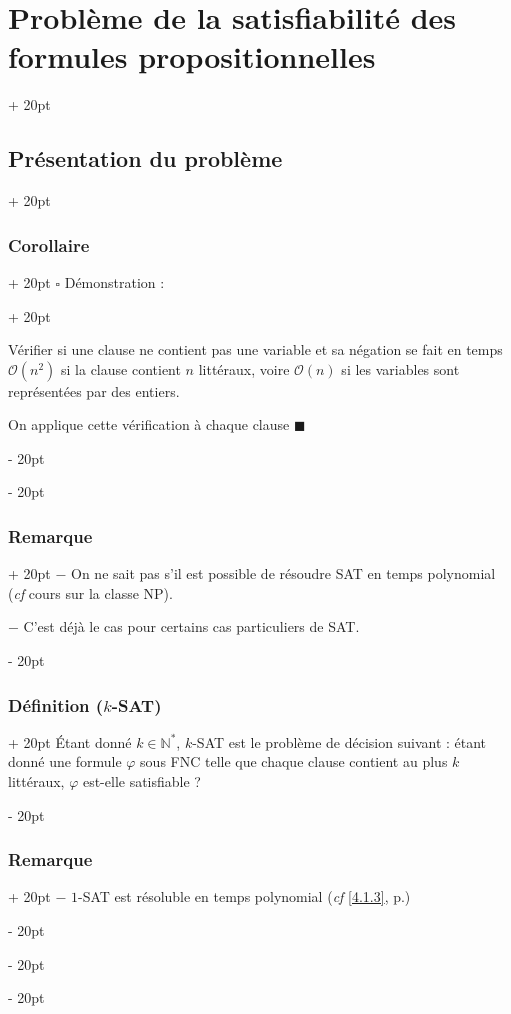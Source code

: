 \documentclass[a4paper, 12pt, twoside]{article}
\newcommand{\N}{\mathbb{N}} %
\newcommand{\ind}[1][20pt]{\advance\leftskip + #1}
\newcommand{\deind}[1][20pt]{\advance\leftskip - #1}
\newenvironment{indt}[2][20pt]{#2 \par \ind[#1]}{\par \deind} %
\begin{document}
\begin{indt}{\section{Problème de la satisfiabilité des formules propositionnelles}}
\begin{indt}{\subsection{Présentation du problème}}
\begin{indt}{\subsubsection{Corollaire}}
\begin{indt}{$\square$ Démonstration :}
                    \vspace{12pt}
                    
                    Vérifier si une clause ne contient pas une variable et sa négation se fait en temps $\mathcal O(n^2)$ si la clause contient $n$ littéraux, voire $\mathcal O(n)$ si les variables sont représentées par des entiers.
                    
                    On applique cette vérification à chaque clause $\blacksquare$
                \end{indt}
            \end{indt}
            
            \vspace{12pt}
            
            \begin{indt}{\subsubsection{Remarque}}
                $-$ On ne sait pas s'il est possible de résoudre SAT en temps polynomial (\textit{cf} cours sur la classe NP).
                
                \vspace{12pt}
                
                $-$ C'est déjà le cas pour certains cas particuliers de SAT.
            \end{indt}
            
            \vspace{12pt}
            
            \begin{indt}{\subsubsection{Définition ($k$-SAT)}}
                \'Etant donné $k \in \N^*$, $k$-SAT est le problème de décision suivant : étant donné une formule $\varphi$ sous FNC telle que chaque clause contient au plus $k$ littéraux, $\varphi$ est-elle satisfiable ?
            \end{indt}
            
            \vspace{12pt}
            
            \begin{indt}{\subsubsection{Remarque}}
                $-$ $1$-SAT est résoluble en temps polynomial (\textit{cf} \ref{4.1.3}, p.\pageref{4.1.3})
                

\end{indt}
\end{indt}
\end{indt}
\end{document}
